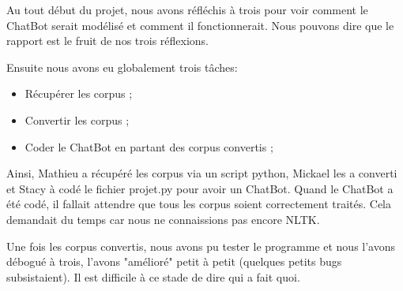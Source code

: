 	Au tout début du projet, nous avons réfléchis à trois pour voir comment le ChatBot serait modélisé et comment il fonctionnerait. Nous pouvons dire que le rapport est le fruit de nos trois réflexions.

	Ensuite nous avons eu globalement trois tâches:
	\begin{itemize}
		\item Récupérer les corpus ;
		\item Convertir les corpus ;
		\item Coder le ChatBot en partant des corpus convertis ;
	\end{itemize}

	Ainsi, Mathieu a récupéré les corpus via un script python, Mickael les a converti et Stacy à codé le fichier projet.py pour avoir un ChatBot.
	Quand le ChatBot a été codé, il fallait attendre que tous les corpus soient correctement traités. Cela demandait du temps car nous ne connaissions pas encore NLTK.

	Une fois les corpus convertis, nous avons pu tester le programme et nous l'avons débogué à trois, l'avons "amélioré" petit à petit (quelques petits bugs subsistaient). Il est difficile à ce stade de dire qui a fait quoi.
